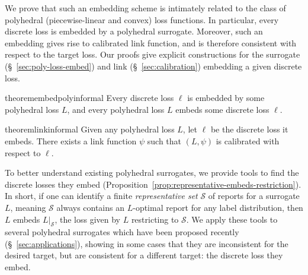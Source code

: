 \documentclass[11pt]{article}
\newcommand{\restatehack}[1]{}   %
\newcommand{\Sc}{\mathcal{S}}
\newtheorem{theorem}{Theorem}
\begin{document}


We prove that such an embedding scheme is intimately related to the class of polyhedral (piecewise-linear and convex) loss functions.
In particular, every discrete loss is embedded by a polyhedral surrogate.
Moreover, such an embedding gives rise to calibrated link function, and is therefore consistent with respect to the target loss.
Our proofs give explicit constructions for the surrogate (\S~\ref{sec:poly-loss-embed}) and link (\S~\ref{sec:calibration}) embedding a given discrete loss.


\restatehack{
  \begin{theorem}
    \label{thm:embed-poly-main}
    \label{thm:link-main}
  \end{theorem}}

\begin{restatable}{theorem}{embedpolyinformal}\label{thm:embed-poly-main}
  Every discrete loss $\ell$ is embedded by some polyhedral loss $L$, and every polyhedral loss $L$ embeds some discrete loss $\ell$.
\end{restatable}

\begin{restatable}{theorem}{linkinformal}\label{thm:link-main}
  Given any polyhedral loss $L$, let $\ell$ be the discrete loss it embeds. There exists a link function $\psi$ such that $(L,\psi)$ is calibrated with respect to $\ell$.
\end{restatable}

To better understand existing polyhedral surrogates, we provide tools to find the discrete losses they embed (Proposition~\ref{prop:representative-embeds-restriction}).
In short, if one can identify a finite \emph{representative set} $\Sc$ of reports for a surrogate $L$, meaning $\Sc$ always contains an $L$-optimal report for any label distribution, then $L$ embeds $L|_\Sc$, the loss given by $L$ restricting to $\Sc$.
We apply these tools to several polyhedral surrogates which have been proposed recently (\S~\ref{sec:applications}), showing in some cases that they are inconsistent for the desired target, but are consistent for a different target: the discrete loss they embed.
\end{document}
